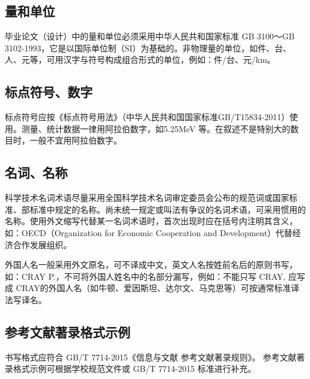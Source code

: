 \subsection{量和单位}
毕业论文（设计）中的量和单位必须采用中华人民共和国家标准 GB 3100～GB 3102-1993，它是以国际单位制（SI）为基础的。非物理量的单位，如件、台、人、元等，可用汉字与符号构成组合形式的单位，例如：件/台、元/km。
\subsection{标点符号、数字}
标点符号应按《标点符号用法》（中华人民共和国国家标准GB/T15834-2011）使用。测量、统计数据一律用阿拉伯数字，如5.25MeV 等。在叙述不是特别大的数目时，一般不宜用阿拉伯数字。
\subsection{名词、名称}
科学技术名词术语尽量采用全国科学技术名词审定委员会公布的规范词或国家标准、部标准中规定的名称。尚未统一规定或叫法有争议的名词术语，可采用惯用的名称。使用外文缩写代替某一名词术语时，首次出现时应在括号内注明其含义，如：OECD（Organization for Economic Cooperation and Development）代替经济合作发展组织。

外国人名一般采用外文原名，可不译成中文，英文人名按姓前名后的原则书写，如：CRAY P.，不可将外国人姓名中的名部分漏写，例如：不能只写 CRAY, 应写成 CRAY的外国人名（如牛顿、爱因斯坦、达尔文、马克思等）可按通常标准译法写译名。
\subsection{参考文献著录格式示例}
书写格式应符合 GB/T 7714-2015《信息与文献 参考文献著录规则》。
参考文献著录格式示例可根据学校规范文件或 GB/T 7714-2015 标准进行补充。
